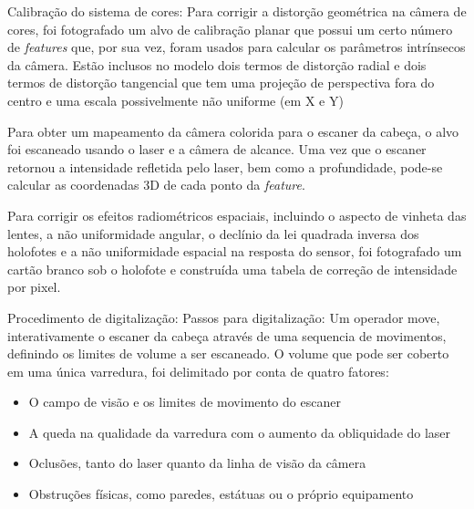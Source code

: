 Calibração do sistema de cores:
Para corrigir a distorção geométrica na câmera de cores, foi fotografado um alvo de calibração planar que possui um certo número de {\it features} que, por sua vez, foram usados para calcular os parâmetros intrínsecos da câmera. Estão inclusos no modelo dois termos de distorção radial e dois termos de distorção tangencial que tem uma projeção de perspectiva fora do centro e uma escala possivelmente não uniforme (em X e Y) %

Para obter um mapeamento da câmera colorida para o escaner da cabeça, o alvo foi escaneado usando o laser e a câmera de alcance. Uma vez que o escaner retornou a intensidade refletida pelo laser, bem como a profundidade, pode-se calcular as coordenadas 3D de cada ponto da {\it feature}.

Para corrigir os efeitos radiométricos espaciais, incluindo o aspecto de vinheta das lentes, a não uniformidade angular, o declínio da lei quadrada inversa dos holofotes e a não uniformidade espacial na resposta do sensor, foi fotografado um cartão branco sob o holofote e construída uma tabela de correção de intensidade por pixel.



Procedimento de digitalização:
Passos para digitalização: Um operador move, interativamente o escaner da cabeça através de uma sequencia de movimentos, definindo os limites de volume a ser escaneado. O volume que pode ser coberto em uma única varredura, foi delimitado por conta de quatro fatores:
\begin{itemize}
\item{O campo de visão e os limites de movimento do escaner}
\item{A  queda na qualidade da varredura com o aumento da obliquidade do laser}
\item{Oclusões, tanto do laser quanto da linha de visão da câmera}
\item{Obstruções físicas, como paredes, estátuas ou o próprio equipamento}
\end{itemize}

